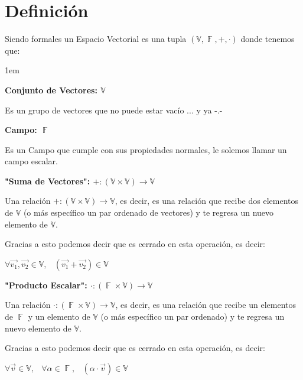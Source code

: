 \documentclass[12pt, fleqn]{report}                             %
\newenvironment{Indentation}[1][0.75em]                         %
        {\begin{adjustwidth}{#1}{}}                                 %
        {\end{adjustwidth}}                                         %
\DeclareMathOperator \Space {\quad}                             %
\DeclareMathOperator \MiniSpace {\;}                            %
\theoremstyle{break}                                            %
\DeclareMathOperator \GenericField {\mathbb{F}}                 %
\begin{document}
        \clearpage
        \section{Definición}

            Siendo formales un Espacio Vectorial es una tupla $(\mathbb{V}, \GenericField, +, \cdot)$ donde tenemos que:
            \begin{Indentation}[1em]
            \begin{itemize}
            \small{
                
                \item
                    \textbf{Conjunto de Vectores: $\mathbb{V}$}

                    Es un grupo de vectores que no puede estar vacío ... y ya -.- 

                \item
                    \textbf{Campo: $\GenericField$}

                    Es un Campo que cumple con sus propiedades normales, le solemos llamar un campo escalar.

                \item
                    \textbf{"Suma de Vectores": $+: (\mathbb{V} \times  \mathbb{V}) \to \mathbb{V}$}

                    Una relación $+: (\mathbb{V} \times  \mathbb{V}) \to \mathbb{V}$, es decir, es una relación
                    que recibe dos elementos de $\mathbb{V}$ (o más específico un par ordenado de vectores) y te
                    regresa un nuevo elemento de $\mathbb{V}$.

                    Gracias a esto podemos decir que es cerrado en esta operación, es decir:

                    $\forall \vec{v_1}, \vec{v_2} \in \mathbb{V},
                        \MiniSpace (\vec{v_1} + \vec{v_2}) \in \mathbb{V}$                            

                \item
                    \textbf{"Producto Escalar": $\cdot: (\GenericField \times  \mathbb{V}) \to \mathbb{V}$}

                    Una relación $\cdot: (\GenericField \times  \mathbb{V}) \to \mathbb{V}$, es decir, es una relación
                    que recibe un elementos de $\GenericField$ y un elemento de $\mathbb{V}$
                    (o más específico un par ordenado) y te regresa un nuevo elemento de $\mathbb{V}$.

                    Gracias a esto podemos decir que es cerrado en esta operación, es decir:

                    $\forall \vec{v} \in \mathbb{V}, \MiniSpace
                        \forall \alpha \in \GenericField, \MiniSpace
                            (\alpha \cdot \vec{v}) \in \mathbb{V}$  
            }
            \end{itemize}
            \end{Indentation}
\end{document}
